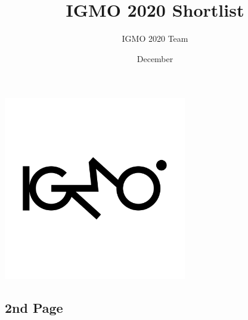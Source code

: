 \documentclass[12pt]{article}
\title{IGMO 2020 Shortlist}
\author{IGMO 2020 Team }
\date{December}
\begin{document}
\maketitle

\begin{center}
    \quad \quad \includegraphics[width = 8cm]{IGMO_SIGMA png (2).png}
\end{center}
\newpage







\newpage


\begin{center}
    \section*{2nd Page}
\end{center}

\newpage



\end{document}
